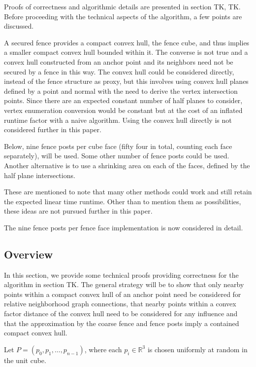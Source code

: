 \documentclass[a4paper,fleqn]{cas-dc}
\begin{document}

Proofs of correctness and algorithmic details are presented in section TK, TK.
Before proceeding with the technical aspects of the algorithm, a few points are discussed.

A secured fence provides a compact convex hull, the fence cube, and thus implies a smaller compact convex
hull bounded within it.
The converse is not true and a convex hull constructed from
an anchor point and its neighbors need not be secured by a fence in this way.
The convex hull could be considered directly, instead of the fence structure as proxy,
but this involves using convex hull planes defined by a point and normal with the need
to derive the vertex intersection points.
Since there are an expected constant number of half planes to consider, vertex enumeration conversion
would be constant but at the cost of an inflated runtime factor with a naive algorithm.
Using the convex hull directly is not considered further in this paper.

Below, nine fence posts per cube face (fifty four in total, counting each face separately), will be used.
Some other number of fence posts could be used.
Another alternative is to use a shrinking area on each of the faces,
defined by the half plane intersections.

These are mentioned to note that many other methods could work and still retain
the expected linear time runtime.
Other than to mention them as possibilities, these ideas are not pursued further in this paper.

The nine fence posts per fence face implementation is now considered in detail.

\subsection{Overview}

In this section, we provide some technical proofs providing correctness for
the algorithm in section TK.
The general strategy will be to show that only nearby points within a compact
convex hull of an anchor point need be considered for relative neighborhood graph
connections, that nearby points within a convex factor distance of the convex hull
need to be considered for any influence and that the approximation by the coarse
fence and fence posts imply a contained compact convex hull.

Let $P = (p _ 0, p _ 1, \dots, p _ {n-1})$, where each $p _ i \in \mathbb{R}^3$ is
chosen uniformly at random in the unit cube.
\end{document}
